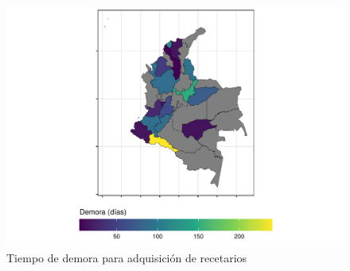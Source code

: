 \documentclass[
]{book}
\begin{document}
\begin{figure}
\includegraphics[width=0.85\linewidth]{InformeFinal_files/figure-latex/tiempoDemoraAdquisicion-1} \caption{Tiempo de demora para adquisición de recetarios}\label{fig:tiempoDemoraAdquisicion}
\end{figure}
\end{document}
